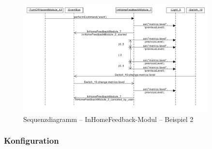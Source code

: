 \begin{figure}[h!]
	\centering
	\includegraphics[width=0.9\textwidth]{img/Modulkonzeption/FeedbackSequenceUser.pdf}
	\caption{Sequenzdiagramm – InHomeFeedback-Modul – Beispiel 2}
	\label{fig:feedbackSequenceUser}
\end{figure}


\subsubsection{Konfiguration}

